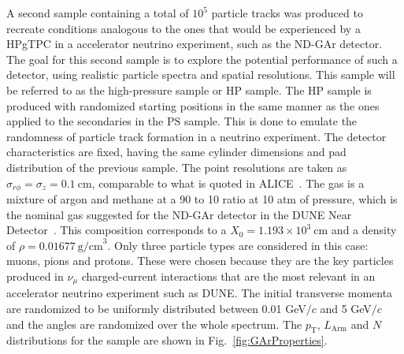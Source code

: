 A second sample containing a total of $10^5$ particle tracks was produced to recreate conditions analogous to the ones that would be experienced by a HPgTPC in a accelerator neutrino experiment, such as the ND-GAr detector. The goal for this second sample is to explore the potential performance of such a detector, using realistic particle spectra and spatial resolutions. This sample will be referred to as the high-pressure sample or HP sample. The HP sample is produced with randomized starting positions in the same manner as the ones applied to the secondaries in the PS sample. This is done to emulate the randomness of particle track formation in a neutrino experiment. The detector characteristics are fixed, having the same cylinder dimensions and pad distribution of the previous sample. The point resolutions are taken as $\sigma_{r\phi}=\sigma_z=0.1 \ \text{cm}$, comparable to what is quoted in ALICE~\cite{LIPPMANN2012}. The gas is a mixture of argon and methane at a 90 to 10 ratio at 10 atm of pressure, which is the nominal gas suggested for the ND-GAr detector in the DUNE Near Detector~\cite{DUNE:2021NDCDR}. This composition corresponds to a $X_0=1.193 \times 10^3 \ \text{cm}$ and a density of $\rho = 0.01677 \ \text{g/cm}^3$. Only three particle types are considered in this case: muons, pions and protons. These were chosen because they are the key particles produced in $\nu_\mu$ charged-current interactions that are the most relevant in an accelerator neutrino experiment such as DUNE. The initial transverse momenta are randomized to be uniformly distributed between 0.01 GeV$/c$ and 5 GeV$/c$ and the angles are randomized  over the whole spectrum. The $p_{\text{T}}$, $L_\textrm{Arm}$ and $N$ distributions for the sample are shown in Fig.~\ref{fig:GArProperties}. %


